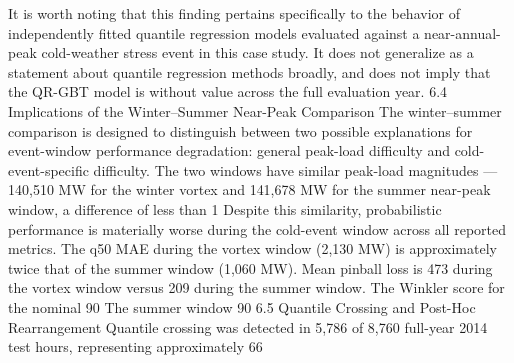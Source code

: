 It is worth noting that this finding pertains specifically to the behavior of independently fitted quantile regression models evaluated against a near-annual-peak cold-weather stress event in this case study. It does not generalize as a statement about quantile regression methods broadly, and does not imply that the QR-GBT model is without value across the full evaluation year.
6.4 Implications of the Winter–Summer Near-Peak Comparison
The winter–summer comparison is designed to distinguish between two possible explanations for event-window performance degradation: general peak-load difficulty and cold-event-specific difficulty. The two windows have similar peak-load magnitudes — 140,510 MW for the winter vortex and 141,678 MW for the summer near-peak window, a difference of less than 1%
Despite this similarity, probabilistic performance is materially worse during the cold-event window across all reported metrics. The q50 MAE during the vortex window (2,130 MW) is approximately twice that of the summer window (1,060 MW). Mean pinball loss is 473 during the vortex window versus 209 during the summer window. The Winkler score for the nominal 90%
The summer window 90%
6.5 Quantile Crossing and Post-Hoc Rearrangement
Quantile crossing was detected in 5,786 of 8,760 full-year 2014 test hours, representing approximately 66%
